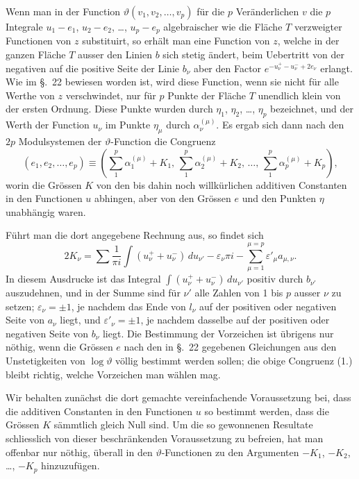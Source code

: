 \documentclass{article}
\begin{document}
Wenn man in der Function $\vartheta(v_1, v_2, \dots, v_p)$ für die $p$ Veränderlichen $v$ die $p$ Integrale $u_1-e_1$, $u_2-e_2$, \dots, $u_p-e_p$ algebraischer wie die Fläche
$T$ verzweigter Functionen von $z$ substituirt, so erhält man eine Function von $z$, welche in der ganzen Fläche $T$ ausser den Linien $b$ sich stetig ändert, beim Uebertritt von der negativen auf die positive Seite der Linie $b_\nu$ aber den Factor $e^{-u^+_\nu-u^-_\nu+2e_\nu}$ erlangt. Wie im \S.~22 bewiesen worden ist, wird diese Function, wenn sie nicht für alle Werthe von $z$ verschwindet, nur für $p$ Punkte der Fläche $T$ unendlich klein von der ersten Ordnung. Diese Punkte wurden durch $\eta_1$, $\eta_2$, \dots, $\eta_p$ bezeichnet, und der Werth der Function $u_\nu$ im Punkte $\eta_\mu$ durch $\alpha_\nu^{(\mu)}$. Es ergab sich dann nach den $2p$ Modulsystemen der $\vartheta$-Function die Congruenz
\[
\tag{(1.)}
(e_1, e_2, \dots, e_p) \equiv \left(\sum_1^p \alpha_1^{(\mu)} + K_1,\, \sum_1^p \alpha_2^{(\mu)} + K_2,\, \dots,\, \sum_1^p \alpha_p^{(\mu)} + K_p\right),
\]
worin die Grössen $K$ von den bis dahin noch willkürlichen additiven Constanten in den Functionen $u$ abhingen, aber von den Grössen $e$ und den Punkten $\eta$ unabhängig waren.

Führt man die dort angegebene Rechnung aus, so findet sich
\[
\tag{(2.)}
2K_\nu = \sum \frac{1}{\pi i} \int (u_\nu^+ + u_\nu^-) \, du_{\nu'} - \varepsilon_\nu \pi i - \sum_{\mu=1}^{\mu=p} \varepsilon'_\mu a_{\mu,\nu}.
\]
In diesem Ausdrucke ist das Integral $\displaystyle\int (u_\nu^+ + u_\nu^-) \, du_{\nu'}$ positiv durch $b_{\nu'}$ auszudehnen, und in der Summe sind für $\nu'$ alle Zahlen von 1 bis $p$ ausser $\nu$ zu setzen; $\varepsilon_\nu = \pm 1$, je nachdem das Ende von $l_\nu$ auf der positiven oder negativen Seite von $a_\nu$ liegt, und $\varepsilon'_\nu = \pm 1$, je nachdem dasselbe auf der positiven oder negativen Seite von $b_\nu$ liegt. Die Bestimmung der Vorzeichen ist übrigens nur nöthig, wenn die Grössen $e$ nach den in \S.~22 gegebenen Gleichungen aus den Unstetigkeiten von $\log \vartheta$ völlig bestimmt werden sollen; die obige Congruenz (1.) bleibt richtig, welche Vorzeichen man wählen mag.

Wir behalten zunächst die dort gemachte vereinfachende Voraussetzung bei, dass die additiven Constanten in den Functionen $u$ so bestimmt werden, dass die Grössen $K$ sämmtlich gleich Null sind. Um die so gewonnenen Resultate schliesslich von dieser beschränkenden Voraussetzung zu befreien, hat man offenbar nur nöthig, überall in den $\vartheta$-Functionen zu den Argumenten $-K_1$, $-K_2$, \dots, $-K_p$ hinzuzufügen.
\end{document}
